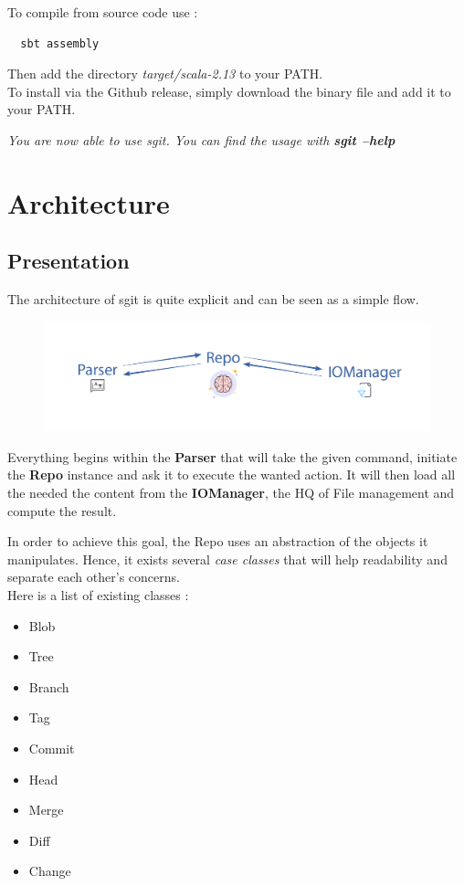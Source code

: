 \documentclass[11pt]{article}
\begin{document}
To compile from source code use :
\begin{lstlisting}
  sbt assembly
\end{lstlisting}

Then add the directory \textit{target/scala-2.13} to your PATH.\\

To install via the Github release, simply download the binary file and add it to your PATH.\\

\begin{center}
  \textit{You are now able to use sgit. You can find the usage with \textbf{sgit --help}}
\end{center}

\section{Architecture}
\subsection{Presentation}
The architecture of sgit is quite explicit and can be seen as a simple flow.

\begin{figure}[h!]
  \centering
  \includegraphics[width=\linewidth]{img/flow.png}
\end{figure}

Everything begins within the \textbf{Parser} that will take the given command, initiate the \textbf{Repo} instance and ask it to execute the wanted action. It will then load all the needed the content from the \textbf{IOManager}, the HQ of File management and compute the result.

In order to achieve this goal, the Repo uses an abstraction of the objects it manipulates. Hence, it exists several \textit{case classes} that will help readability and separate each other's concerns.\\

Here is a list of existing classes :
\begin{multicols}{3}
\begin{itemize}
  \setlength\itemsep{0.1em}
  \item Blob
  \item Tree
  \item Branch
  \item Tag
  \item Commit
  \item Head
  \item Merge
  \item Diff
  \item Change
\end{itemize}
\end{multicols}
\end{document}
